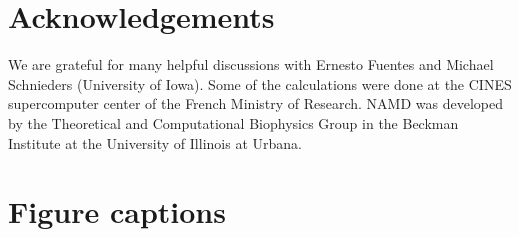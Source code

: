 \documentclass[12pt]{article}
\begin{document}
\section*{Acknowledgements}
We are grateful for many helpful discussions with Ernesto Fuentes and Michael Schnieders (University of Iowa). Some of
the calculations were done at the CINES supercomputer center of the French Ministry of Research. NAMD was developed by
the Theoretical and Computational Biophysics Group in the Beckman Institute at the University of Illinois at Urbana.

\small 


\clearpage
\pagebreak

\section*{Figure captions}
\end{document}
